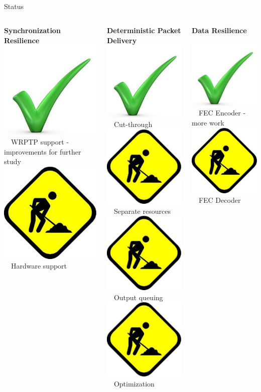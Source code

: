 \documentclass[compress,red]{beamer}
\begin{document}
\subsection{}
\begin{frame}{Status}


\begin{columns}[c]

    \begin{block}{{\bf Synchronization Resilience}}
      \includegraphics[width=.5cm]{misc/big-tick.pdf}~~WRPTP support - improvements for further study \\
      \includegraphics[width=.5cm]{misc/underconstruction.pdf}~~Hardware support
    \end{block}

    \begin{block}{{\bf Deterministic Packet Delivery}}
      \includegraphics[width=.5cm]{misc/big-tick.pdf}~~Cut-through \\
      \includegraphics[width=.5cm]{misc/underconstruction.pdf}~~Separate resources \\
      \includegraphics[width=.5cm]{misc/underconstruction.pdf}~~Output queuing \\
      \includegraphics[width=.5cm]{misc/underconstruction.pdf}~~Optimization
    \end{block}

    \begin{block}{{\bf Data Resilience}}

      \includegraphics[width=.5cm]{misc/big-tick.pdf}~~FEC Encoder - more work \\
      \includegraphics[width=.5cm]{misc/underconstruction.pdf}~~FEC Decoder


\end{block}
\end{columns}
\end{frame}
\end{document}
